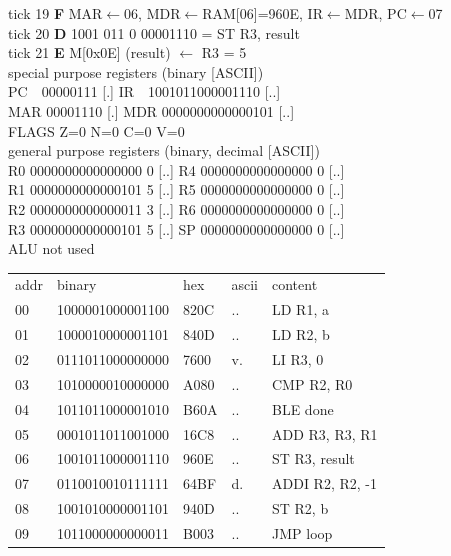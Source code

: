 \noindent\begin{tcolorbox}[stepbox, title={Instruction 7 \hfill ticks 19 to 21 \quad ST R3, result}]
\textcolor{dim}{tick 19} \textbf{F} MAR$\leftarrow$06, MDR$\leftarrow$RAM[06]=960E, IR$\leftarrow$MDR, PC$\leftarrow$07\\
\textcolor{dim}{tick 20} \textbf{D} 1001 011 0 00001110 = ST R3, result\\
\textcolor{dim}{tick 21} \textbf{E} M[0x0E] (result) $\leftarrow$ R3 = 5\\[2pt]
\textcolor{dim}{special purpose registers (binary [ASCII])}\\
PC~~00000111 [.] \hfill IR~~1001011000001110 [..]\\
MAR 00001110 [.] \hfill MDR 0000000000000101 [..]\\
FLAGS Z=0 N=0 C=0 V=0\\[2pt]
\textcolor{dim}{general purpose registers (binary, decimal [ASCII])}\\
R0 0000000000000000 0 [..] \hfill R4 0000000000000000 0 [..]\\
R1 0000000000000101 5 [..] \hfill R5 0000000000000000 0 [..]\\
R2 0000000000000011 3 [..] \hfill R6 0000000000000000 0 [..]\\
R3 0000000000000101 5 [..] \hfill SP 0000000000000000 0 [..]\\
\textcolor{dim}{ALU not used}\\[2pt]
{\setlength{\tabcolsep}{2pt}\begin{tabular}{@{}lllll@{}}
\textcolor{dim}{addr} & \textcolor{dim}{binary} & \textcolor{dim}{hex} & \textcolor{dim}{ascii} & \textcolor{dim}{content}\\
00 & 1000001000001100 & 820C & .. & LD R1, a\\
01 & 1000010000001101 & 840D & .. & LD R2, b\\
02 & 0111011000000000 & 7600 & v. & LI R3, 0\\
03 & 1010000010000000 & A080 & .. & CMP R2, R0\\
04 & 1011011000001010 & B60A & .. & BLE done\\
05 & 0001011011001000 & 16C8 & .. & ADD R3, R3, R1\\
06 & 1001011000001110 & 960E & .. & ST R3, result\\
\rowcolor{pcc}07 & 0110010010111111 & 64BF & d. & ADDI R2, R2, -1\\
08 & 1001010000001101 & 940D & .. & ST R2, b\\
09 & 1011000000000011 & B003 & .. & JMP loop\\

\end{tabular}}
\end{tcolorbox}
